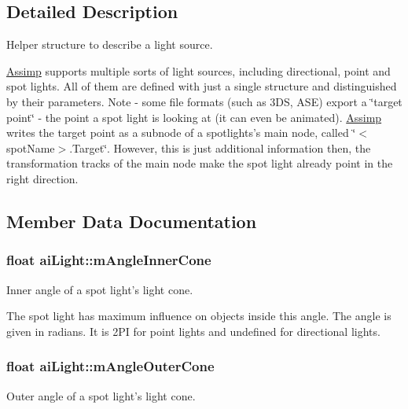 \subsection{\-Detailed \-Description}
\-Helper structure to describe a light source.

\hyperlink{namespaceAssimp}{\-Assimp} supports multiple sorts of light sources, including directional, point and spot lights. \-All of them are defined with just a single structure and distinguished by their parameters. \-Note -\/ some file formats (such as 3\-D\-S, \-A\-S\-E) export a \char`\"{}target point\char`\"{} -\/ the point a spot light is looking at (it can even be animated). \hyperlink{namespaceAssimp}{\-Assimp} writes the target point as a subnode of a spotlights's main node, called \char`\"{}$<$spot\-Name$>$.\-Target\char`\"{}. \-However, this is just additional information then, the transformation tracks of the main node make the spot light already point in the right direction. 

\subsection{\-Member \-Data \-Documentation}
\hypertarget{structaiLight_abad0466811938623e98bf1d334143f9a}{
\subsubsection[{m\-Angle\-Inner\-Cone}]{\setlength{\rightskip}{0pt plus 5cm}float {\bf ai\-Light\-::m\-Angle\-Inner\-Cone}}}\label{structaiLight_abad0466811938623e98bf1d334143f9a}
\-Inner angle of a spot light's light cone.

\-The spot light has maximum influence on objects inside this angle. \-The angle is given in radians. \-It is 2\-P\-I for point lights and undefined for directional lights. \hypertarget{structaiLight_a20fd332a5f9d8e8cb94816ff2b0ae7f4}{
\subsubsection[{m\-Angle\-Outer\-Cone}]{\setlength{\rightskip}{0pt plus 5cm}float {\bf ai\-Light\-::m\-Angle\-Outer\-Cone}}}\label{structaiLight_a20fd332a5f9d8e8cb94816ff2b0ae7f4}
\-Outer angle of a spot light's light cone.

